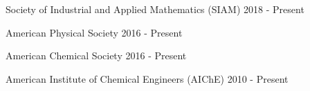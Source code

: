 \begin{cvhonors}[1.5cm]  \cvhonor
    {} %
    {Society of Industrial and Applied Mathematics (SIAM)} %
    {} %
    {2018 - Present} %

  \cvhonor
    {} %
    {American Physical Society} %
    {} %
    {2016 - Present} %

  \cvhonor
    {} %
    {American Chemical Society} %
    {} %
    {2016 - Present} %

  \cvhonor
    {} %
    {American Institute of Chemical Engineers (AIChE)} %
    {} %
    {2010 - Present} %

\end{cvhonors}